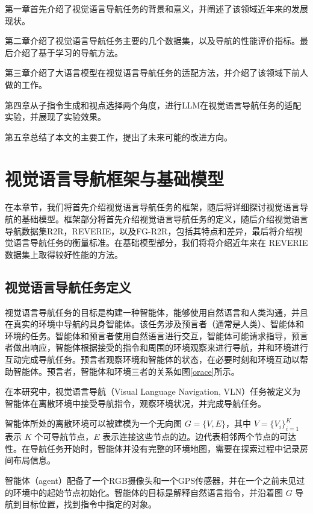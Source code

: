\documentclass[bachelor]{thesis-uestc}
\begin{document}
第一章首先介绍了视觉语言导航任务的背景和意义，并阐述了该领域近年来的发展现状。

第二章介绍了视觉语言导航任务主要的几个数据集，以及导航的性能评价指标。最后介绍了基于学习的导航方法。

第三章介绍了大语言模型在视觉语言导航任务的适配方法，并介绍了该领域下前人做的工作。

第四章从子指令生成和视点选择两个角度，进行LLM在视觉语言导航任务的适配实验，并展现了实验效果。

第五章总结了本文的主要工作，提出了未来可能的改进方向。

\chapter{视觉语言导航框架与基础模型}

在本章节，我们将首先介绍视觉语言导航任务的框架，随后将详细探讨视觉语言导航的基础模型。框架部分将首先介绍视觉语言导航任务的定义，随后介绍视觉语言导航数据集R2R，REVERIE，以及FG-R2R，包括其特点和差异，最后将介绍视觉语言导航任务的衡量标准。在基础模型部分，我们将将介绍近年来在 REVERIE 数据集上取得较好性能的方法。

\section{视觉语言导航任务定义}

视觉语言导航任务的目标是构建一种智能体，能够使用自然语言和人类沟通，并且在真实的环境中导航的具身智能体。该任务涉及预言者（通常是人类）、智能体和环境的任务。智能体和预言者使用自然语言进行交互，智能体可能请求指导，预言者做出响应，智能体根据接受的指令和周围的环境观察来进行导航，并和环境进行互动完成导航任务。预言者观察环境和智能体的状态，在必要时刻和环境互动以帮助智能体。预言者，智能体和环境三者的关系如图\ref{orace}\cite{guVisionandLanguageNavigationSurvey2022}所示。

在本研究中，视觉语言导航（Visual Language Navigation, VLN）任务被定义为智能体在离散环境中接受导航指令，观察环境状况，并完成导航任务。

智能体所处的离散环境可以被建模为一个无向图 \( G = \{V, E\} \)，其中 \( V = \{V_i\}_{i=1}^{K} \) 表示 \( K \) 个可导航节点，\( E \) 表示连接这些节点的边。边代表相邻两个节点的可达性。在导航任务开始时，智能体并没有完整的环境地图，需要在探索过程中记录房间布局信息。

智能体（agent）配备了一个RGB摄像头和一个GPS传感器，并在一个之前未见过的环境中的起始节点初始化。智能体的目标是解释自然语言指令，并沿着图 \( G \) 导航到目标位置，找到指令中指定的对象。
\end{document}
